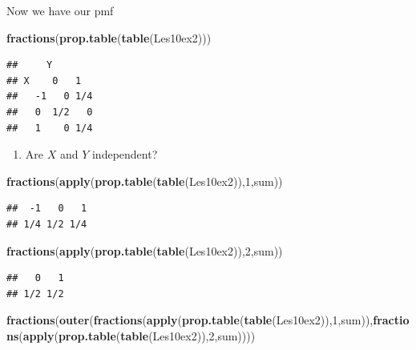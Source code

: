 \documentclass[]{book}
\newenvironment{Shaded}{\begin{snugshade}}{\end{snugshade}}
\newcommand{\KeywordTok}[1]{\textcolor[rgb]{0.13,0.29,0.53}{\textbf{#1}}}
\newcommand{\DecValTok}[1]{\textcolor[rgb]{0.00,0.00,0.81}{#1}}
\newcommand{\NormalTok}[1]{#1}
\providecommand{\tightlist}{%
  \setlength{\itemsep}{0pt}\setlength{\parskip}{0pt}}
\theoremstyle{definition}
\theoremstyle{definition}
\theoremstyle{definition}
\theoremstyle{remark}
\begin{document}
Now we have our pmf

\begin{Shaded}
\begin{Highlighting}[]
\KeywordTok{fractions}\NormalTok{(}\KeywordTok{prop.table}\NormalTok{(}\KeywordTok{table}\NormalTok{(Les10ex2)))}
\end{Highlighting}
\end{Shaded}

\begin{verbatim}
##     Y
## X    0   1  
##   -1   0 1/4
##   0  1/2   0
##   1    0 1/4
\end{verbatim}

\begin{enumerate}
\def\labelenumi{\arabic{enumi}.}
\tightlist
\item
  Are \(X\) and \(Y\) independent?
\end{enumerate}

\begin{Shaded}
\begin{Highlighting}[]
\KeywordTok{fractions}\NormalTok{(}\KeywordTok{apply}\NormalTok{(}\KeywordTok{prop.table}\NormalTok{(}\KeywordTok{table}\NormalTok{(Les10ex2)),}\DecValTok{1}\NormalTok{,sum))}
\end{Highlighting}
\end{Shaded}

\begin{verbatim}
##  -1   0   1 
## 1/4 1/2 1/4
\end{verbatim}

\begin{Shaded}
\begin{Highlighting}[]
\KeywordTok{fractions}\NormalTok{(}\KeywordTok{apply}\NormalTok{(}\KeywordTok{prop.table}\NormalTok{(}\KeywordTok{table}\NormalTok{(Les10ex2)),}\DecValTok{2}\NormalTok{,sum))}
\end{Highlighting}
\end{Shaded}

\begin{verbatim}
##   0   1 
## 1/2 1/2
\end{verbatim}

\begin{Shaded}
\begin{Highlighting}[]
\KeywordTok{fractions}\NormalTok{(}\KeywordTok{outer}\NormalTok{(}\KeywordTok{fractions}\NormalTok{(}\KeywordTok{apply}\NormalTok{(}\KeywordTok{prop.table}\NormalTok{(}\KeywordTok{table}\NormalTok{(Les10ex2)),}\DecValTok{1}\NormalTok{,sum)),}\KeywordTok{fractions}\NormalTok{(}\KeywordTok{apply}\NormalTok{(}\KeywordTok{prop.table}\NormalTok{(}\KeywordTok{table}\NormalTok{(Les10ex2)),}\DecValTok{2}\NormalTok{,sum))))}
\end{Highlighting}
\end{Shaded}
\end{document}
